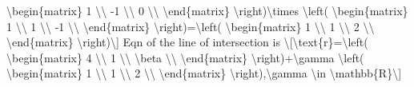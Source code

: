 \textbackslash begin\{matrix\} 1 \textbackslash\textbackslash{}
-1 \textbackslash\textbackslash{} 0 \textbackslash\textbackslash{}
\textbackslash end\{matrix\} \textbackslash right)\textbackslash times
\textbackslash left( \textbackslash begin\{matrix\} 1 \textbackslash\textbackslash{}
1 \textbackslash\textbackslash{} -1 \textbackslash\textbackslash{}
\textbackslash end\{matrix\} \textbackslash right)=\textbackslash left(
\textbackslash begin\{matrix\} 1 \textbackslash\textbackslash{}
1 \textbackslash\textbackslash{} 2 \textbackslash\textbackslash{}
\textbackslash end\{matrix\} \textbackslash right)\textbackslash{]}
Eqn of the line of intersection is \textbackslash{[}\textbackslash text\{r\}=\textbackslash left(
\textbackslash begin\{matrix\} 4 \textbackslash\textbackslash{}
1 \textbackslash\textbackslash{} \textbackslash beta \textbackslash\textbackslash{}
\textbackslash end\{matrix\} \textbackslash right)+\textbackslash gamma
\textbackslash left( \textbackslash begin\{matrix\} 1 \textbackslash\textbackslash{}
1 \textbackslash\textbackslash{} 2 \textbackslash\textbackslash{}
\textbackslash end\{matrix\} \textbackslash right),\textbackslash gamma
\textbackslash in \textbackslash mathbb\{R\}\textbackslash{]}